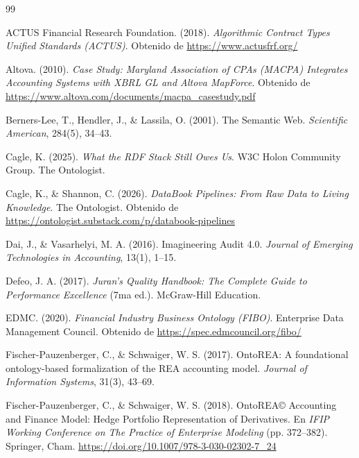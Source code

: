\documentclass[12pt, a4paper]{article}
\begin{document}
\begin{thebibliography}{99}

ACTUS Financial Research Foundation. (2018). \textit{Algorithmic Contract Types Unified Standards (ACTUS)}. Obtenido de \url{https://www.actusfrf.org/}

Altova. (2010). \textit{Case Study: Maryland Association of CPAs (MACPA) Integrates Accounting Systems with XBRL GL and Altova MapForce}. Obtenido de \url{https://www.altova.com/documents/macpa_casestudy.pdf}

Berners-Lee, T., Hendler, J., \& Lassila, O. (2001). The Semantic Web. \textit{Scientific American}, 284(5), 34--43.

Cagle, K. (2025). \textit{What the RDF Stack Still Owes Us}. W3C Holon Community Group. The Ontologist.

Cagle, K., \& Shannon, C. (2026). \textit{DataBook Pipelines: From Raw Data to Living Knowledge}. The Ontologist. Obtenido de \url{https://ontologist.substack.com/p/databook-pipelines}

Dai, J., \& Vasarhelyi, M. A. (2016). Imagineering Audit 4.0. \textit{Journal of Emerging Technologies in Accounting}, 13(1), 1--15.

Defeo, J. A. (2017). \textit{Juran's Quality Handbook: The Complete Guide to Performance Excellence} (7ma ed.). McGraw-Hill Education.

EDMC. (2020). \textit{Financial Industry Business Ontology (FIBO)}. Enterprise Data Management Council. Obtenido de \url{https://spec.edmcouncil.org/fibo/}

Fischer-Pauzenberger, C., \& Schwaiger, W. S. (2017). OntoREA: A foundational ontology-based formalization of the REA accounting model. \textit{Journal of Information Systems}, 31(3), 43--69.

Fischer-Pauzenberger, C., \& Schwaiger, W. S. (2018). OntoREA\copyright{} Accounting and Finance Model: Hedge Portfolio Representation of Derivatives. En \textit{IFIP Working Conference on The Practice of Enterprise Modeling} (pp. 372--382). Springer, Cham. \url{https://doi.org/10.1007/978-3-030-02302-7_24}


\end{thebibliography}
\end{document}
